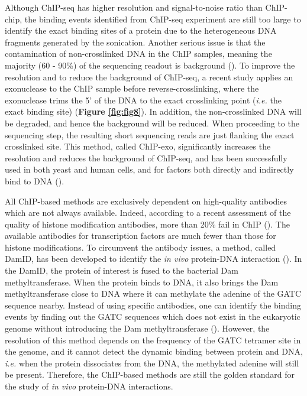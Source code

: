 Although ChIP-seq has higher resolution and signal-to-noise ratio than ChIP-chip, the binding events identified from ChIP-seq experiment are still too large to identify the exact binding sites of a protein due to the heterogeneous DNA fragments generated by the sonication. Another serious issue is that the contamination of non-crosslinked DNA in the ChIP samples, meaning the majority (60 - 90\%) of the sequencing readout is background (\cite{pepke2009computation,rhee2011comprehensive}). To improve the resolution and to reduce the background of ChIP-seq, a recent study applies an exonuclease to the ChIP sample before reverse-crosslinking, where the exonuclease trims the 5’ of the DNA to the exact crosslinking point (\textit{i.e.} the exact binding site) (\textbf{Figure \ref{fig:fig8}}). In addition, the non-crosslinked DNA will be degraded, and hence the background will be reduced. When proceeding to the sequencing step, the resulting short sequencing reads are just flanking the exact crosslinked site. This method, called ChIP-exo, significantly increases the resolution and reduces the background of ChIP-seq, and has been successfully used in both yeast and human cells, and for factors both directly and indirectly bind to DNA (\cite{rhee2011comprehensive,rhee2012genome-wide,yen2012genome-wide}).

All ChIP-based methods are exclusively dependent on high-quality antibodies which are not always available. Indeed, according to a recent assessment of the quality of histone modification antibodies, more than 20\% fail in ChIP (\cite{egelhofer2011an}). The available antibodies for transcription factors are much fewer than those for histone modifications. To circumvent the antibody issues, a method, called DamID, has been developed to identify the \textit{in vivo} protein-DNA interaction (\cite{van-steensel2000identification}). In the DamID, the protein of interest is fused to the bacterial Dam methyltransferase. When the protein binds to DNA, it also brings the Dam methyltransferase close to DNA where it can methylate the adenine of the GATC sequence nearby. Instead of using specific antibodies, one can identify the binding events by finding out the GATC sequences which does not exist in the eukaryotic genome without introducing the Dam methyltransferase (\cite{van-steensel2000identification}). However, the resolution of this method depends on the frequency of the GATC tetramer site in the genome, and it cannot detect the dynamic binding between protein and DNA, \textit{i.e.} when the protein dissociates from the DNA, the methylated adenine will still be present. Therefore, the ChIP-based methods are still the golden standard for the study of \textit{in vivo} protein-DNA interactions.


